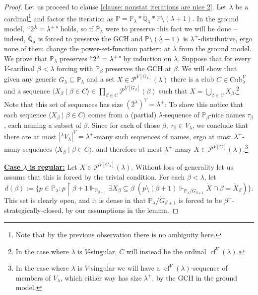 \documentclass[11pt]{amsart}
\renewcommand{\restriction}{\mathbin\upharpoonright}    %
\theoremstyle{definition}
\newcounter{condition}
\theoremstyle{remark}
\newcommand\<{{<}}
\def\s{\subseteq}
\def\forces{\Vdash}
\DeclareMathOperator{\cf}{cf}
\begin{document}
\begin{proof}
    Let us proceed to clause \eqref{clause: nonstat iterations are nice 2}.
    Let $\lambda$ be a cardinal\footnote{Note that by the previous observation there is no ambiguity here.} and factor the iteration as $\mathbb{P}=\mathbb{P}_\lambda\ast \dot{\mathbb{Q}}_\lambda\ast \mathbb{P}\setminus (\lambda+1).$ In the ground model, $``2^\lambda=\lambda^+$" holds, so if $\mathbb{P}_\lambda$ were to preserve this fact we will be done – indeed, $\dot{\mathbb{Q}}_\lambda$ is forced to preserve the $\mathrm{GCH}$ and $\mathbb{P}\setminus (\lambda+1)$ is $\lambda^+$-distributive, ergo none of them change the power-set-function pattern at $\lambda$ from the ground model. We prove that  $\mathbb{P}_\lambda$ preserves $``2^\lambda=\lambda^+$" by induction on $\lambda$. Suppose that for every $V$-cardinal $\beta<\lambda$ forcing with $\mathbb{P}_\beta$ preserves the GCH at $\beta$. We will show that given any generic $G_\lambda\s \mathbb{P}_\lambda$ and a set $X\in \mathcal{P}^{V[G_\lambda]}(\lambda)$ there is a club $C\in \mathrm{Cub}^V_\lambda$ and a sequence $\langle X_\beta\mid \beta\in C\rangle\in \prod_{\beta\in C} \mathcal{P}^{V[G_\beta]}(\beta)$ 
    such that $X=\bigcup_{\beta\in C} X_\beta$.\footnote{In the case where $\lambda$ is $V$-singular, $C$ will instead be the ordinal $\cf^V(\lambda)$.} Note that this set of sequences has size $(2^\lambda)^V=\lambda^+$: 
    To show this notice that each sequence $\langle X_\beta\mid \beta\in C\rangle$ comes from a  (partial) $\lambda$-sequence of $\mathbb{P}_\beta$-nice names $\tau_\beta$, each  naming a subset of $\beta$. Since for each of those $\beta$,   $\tau_\beta\in V_\lambda$, we conclude that there are at most $|{}^\lambda V_\lambda|^V=\lambda^+$-many such sequences of names, ergo at most $\lambda^+$-many sequences $\langle X_\beta\mid \beta\in C\rangle$, and therefore at most $\lambda^+$-many $X\in \mathcal{P}^{V[G]}(\lambda)$.\footnote{In the case where $\lambda$ is $V$-singular we will have a $\cf^V(\lambda)$-sequence of members of $V_\lambda$, which  either way  has size $\lambda^+$, by the GCH in the ground model.}

    \smallskip

 
   \textbf{\underline{Case $\lambda$ is regular:}} 
  Let $X\in \mathcal{P}^{V[G_\lambda]}(\lambda)$. Without loss of generality let us assume that this is forced by the trivial condition. For each $\beta<\lambda$, let $$d(\beta):=\{p\in \mathbb{P}_\lambda :  p\restriction \beta+1\forces_{\mathbb{P}_{\beta+1}} \exists \dot{X}_\beta\s \beta\;(p\setminus (\beta+1)\forces_{\mathbb{P}_\lambda/\dot{G}_{\beta+1}} \dot{X}\cap \beta=\dot{X}_\beta)\}.$$ 
  This set is clearly open, and it is dense in that $\mathbb{P}_\lambda/\dot{G}_{\beta+1}$ is forced to be $\beta^+$-strategically-closed, by our assumptions in the lemma.
  

\end{proof}
\end{document}
